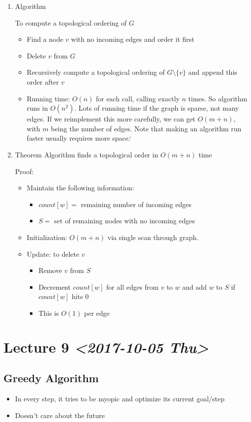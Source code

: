 \documentclass[11pt]{article}
\begin{document}
\begin{enumerate}
\item Algorithm
\label{sec:org0ccc15f}

To compute a topological ordering of \(G\)
\begin{itemize}
\item Find a node \(v\) with no incoming edges and order it first
\item Delete \(v\) from \(G\)
\item Recursively compute a topological ordering of \(G\setminus \{v\}\) and append this order after \(v\)
\item Running time: \(O(n)\) for each call, calling exactly \(n\) times. So algorithm runs in \(O(n^2)\). Lots of running time if the graph is sparse, not many edges. If we reimplement this more carefully, we can get \(O(m+n)\), with \(m\) being the number of edges. Note that making an algorithm run faster usually requires more space.`
\end{itemize}
\item Theorem
\label{sec:org574c1cb}
Algorithm finds a topological order in \(O(m+n)\) time

Proof:
\begin{itemize}
\item Maintain the following information:
\begin{itemize}
\item \(count[w] =\) remaining number of incoming edges
\item \(S=\) set of remaining nodes with no incoming edges
\end{itemize}
\item Initialization: \(O(m+n)\) via single scan through graph.
\item Update: to delete \(v\)
\begin{itemize}
\item Remove \(v\) from \(S\)
\item Decrement \(count[w]\) for all edges from \(v\) to \(w\) and add \(w\) to \(S\) if \(count[w]\) hits \(0\)
\item This is \(O(1)\) per edge
\end{itemize}
\end{itemize}
\end{enumerate}
\section{Lecture 9 \textit{<2017-10-05 Thu>}}
\label{sec:orgcd528c6}
\subsection{Greedy Algorithm}
\label{sec:org5d0a5b1}
\begin{itemize}
\item In every step, it tries to be myopic and optimize its current goal/step
\item Doesn't care about the future
\end{itemize}
\end{document}
